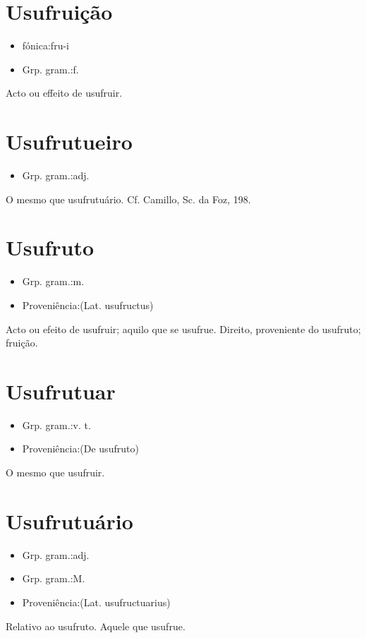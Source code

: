 \documentclass{article}
\begin{document}
\section{Usufruição}
\begin{itemize}
\item {fónica:fru-i}
\end{itemize}
\begin{itemize}
\item {Grp. gram.:f.}
\end{itemize}
Acto ou effeito de usufruir.
\section{Usufrutueiro}
\begin{itemize}
\item {Grp. gram.:adj.}
\end{itemize}
O mesmo que \textunderscore usufrutuário\textunderscore . Cf. Camillo, \textunderscore Sc. da Foz\textunderscore , 198.
\section{Usufruto}
\begin{itemize}
\item {Grp. gram.:m.}
\end{itemize}
\begin{itemize}
\item {Proveniência:(Lat. \textunderscore usufructus\textunderscore )}
\end{itemize}
Acto ou efeito de usufruir; aquilo que se usufrue.
Direito, proveniente do usufruto; fruição.
\section{Usufrutuar}
\begin{itemize}
\item {Grp. gram.:v. t.}
\end{itemize}
\begin{itemize}
\item {Proveniência:(De \textunderscore usufruto\textunderscore )}
\end{itemize}
O mesmo que \textunderscore usufruir\textunderscore .
\section{Usufrutuário}
\begin{itemize}
\item {Grp. gram.:adj.}
\end{itemize}
\begin{itemize}
\item {Grp. gram.:M.}
\end{itemize}
\begin{itemize}
\item {Proveniência:(Lat. \textunderscore usufructuarius\textunderscore )}
\end{itemize}
Relativo ao usufruto.
Aquele que usufrue.
\end{document}
